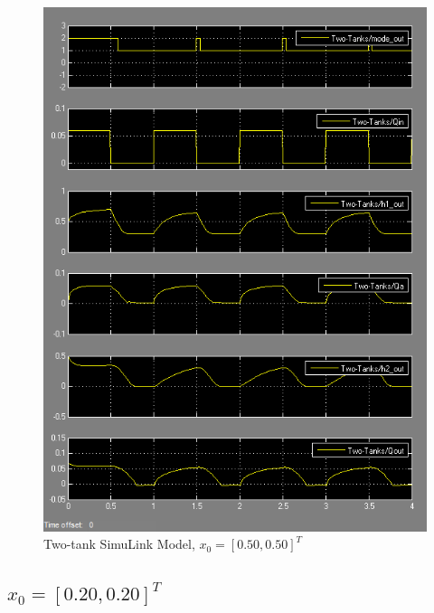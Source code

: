 \documentclass{article}
\begin{document}
\begin{figure}[h!]
\centering
\includegraphics[scale=0.7]{hw8_50_50.png}
\caption{Two-tank SimuLink Model, $x_0 = [0.50, 0.50]^T$ }
\label{fig:two-tank-model-50-50}
\end{figure}

\subsection{$x_0 = [0.20, 0.20]^T$}
\end{document}
